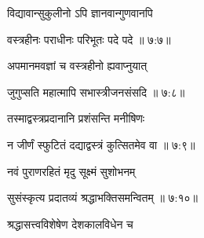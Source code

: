 {\devanagarifont विद्यावान्सुकुलीनो ऽपि ज्ञानवान्गुणवानपि \thinspace{\dandab} \dontdisplaylinenum }%
 

{\devanagarifont वस्त्रहीनः पराधीनः परिभूतः पदे पदे {॥ ७:\hspace{.11em}७॥} \veg\dontdisplaylinenum }%
 
{\devanagarifont अपमानमवज्ञां च वस्त्रहीनो ह्यवाप्नुयात् \thinspace{\dandab} \dontdisplaylinenum }%


{\devanagarifont जुगुप्सति महात्मापि सभास्त्रीजनसंसदि {॥ ७:\hspace{.11em}८॥} \veg\dontdisplaylinenum }%
 
{\devanagarifont तस्माद्वस्त्रप्रदानानि प्रशंसन्ति मनीषिणः \thinspace{\dandab} \dontdisplaylinenum }%
 

{\devanagarifont न जीर्णं स्फुटितं दद्याद्वस्त्रं कुत्सितमेव वा {॥ ७:\hspace{.11em}९॥} \veg\dontdisplaylinenum }%

{\devanagarifont नवं पुराणरहितं मृदु सूक्ष्मं सुशोभनम् \thinspace{\dandab} \dontdisplaylinenum }%


{\devanagarifont सुसंस्कृत्य प्रदातव्यं श्रद्धाभक्तिसमन्वितम् {॥ ७:\hspace{.11em}१०॥} \veg\dontdisplaylinenum }%

\pend
\endnumbering
\vfill\pagebreak\beginnumbering\pstart
\vers

{\devanagarifont श्रद्धासत्त्वविशेषेण देशकालविधेन च \thinspace{\dandab} \dontdisplaylinenum }%


